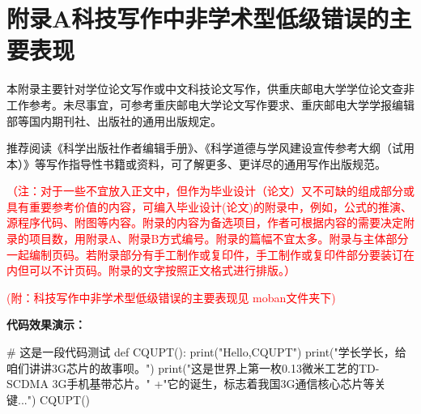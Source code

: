 
\chapter{附录A\quad 科技写作中非学术型低级错误的主要表现}

本附录主要针对学位论文写作或中文科技论文写作，供重庆邮电大学学位论文查非工作参考。未尽事宜，可参考重庆邮电大学论文写作要求、重庆邮电大学学报编辑部等国内期刊社、出版社的通用出版规定。

推荐阅读《科学出版社作者编辑手册》、《科学道德与学风建设宣传参考大纲（试用本）》等写作指导性书籍或资料，可了解更多、更详尽的通用写作出版规范。

\textcolor{red}{（注：对于一些不宜放入正文中，但作为毕业设计（论文）又不可缺的组成部分或具有重要参考价值的内容，可编入毕业设计(论文)的附录中，例如，公式的推演、源程序代码、附图等内容。附录的内容为备选项目，作者可根据内容的需要决定附录的项目数，用附录A、附录B方式编号。附录的篇幅不宜太多。附录与主体部分一起编制页码。若附录部分有手工制作或复印件，手工制作或复印件部分要装订在内但可以不计页码。附录的文字按照正文格式进行排版。）}

\textcolor{red}{(附：科技写作中非学术型低级错误的主要表现见 moban文件夹下)}

\textbf{代码效果演示：}
\begin{python}
# 这是一段代码测试
def CQUPT():
    print("Hello,CQUPT")
    print("学长学长，给咱们讲讲3G芯片的故事呗。")
    print("这是世界上第一枚0.13微米工艺的TD-SCDMA 3G手机基带芯片。"
         +"它的诞生，标志着我国3G通信核心芯片等关键...")
CQUPT()
\end{python}
\newpage\quad %

